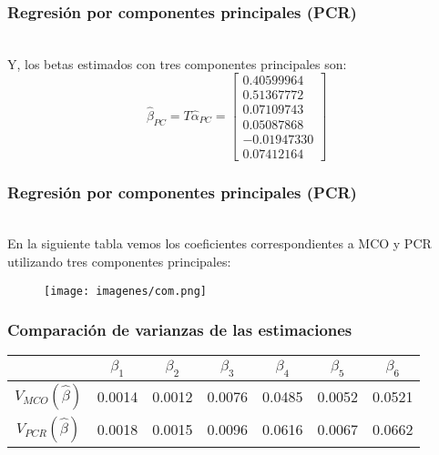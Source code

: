 \documentclass[12pt]{beamer}
\begin{document}
\begin{frame}
\frametitle{Regresión por componentes principales (PCR)}
~\\Y, los betas estimados con tres componentes principales son:
$$\hat{\beta}_{PC}=T\hat{\alpha}_{PC}=\left[\begin{matrix}
 0.40599964 \\ 
 0.51367772 \\ 
 0.07109743 \\ 
 0.05087868 \\ 
 -0.01947330 \\ 
 0.07412164
 \end{matrix}\right]$$
\end{frame}

\begin{frame}
\frametitle{Regresión por componentes principales (PCR)}
~\\En la siguiente tabla vemos los coeficientes correspondientes a MCO y PCR utilizando tres componentes principales:
\begin{figure}[!h]
    \begin{center}
        \texttt{[image: imagenes/com.png]}
        \label{fig:Densidad}
    \end{center}
\end{figure}
\end{frame}

\begin{frame}
\frametitle{Comparación de varianzas de las estimaciones}
\begin{center}
\begin{tabular}{|ccccccc|}
\hline 
 & $\beta_{1}$ & $\beta_{2}$ & $\beta_{3}$ & $\beta_{4}$ & $\beta_{5}$ & $\beta_{6}$ \\ 
\hline 
$V_{MCO}(\hat{\beta})$ & 0.0014 & 0.0012 & 0.0076 & 0.0485 & 0.0052 & 0.0521 \\ 
\hline 
$V_{PCR}(\hat{\beta})$ & 0.0018 & 0.0015 & 0.0096 & 0.0616 & 0.0067 & 0.0662 \\ 
\hline 
\end{tabular} 
\end{center}
\end{frame}
\end{document}
